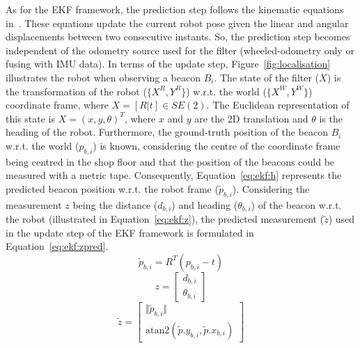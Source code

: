 \documentclass[conference]{IEEEtran}
\begin{document}
As for the EKF framework, the prediction step follows the kinematic equations in~\cite{5dpo:sousa-2022}. These equations update the current robot pose given the linear and angular displacements between two consecutive instants. So, the prediction step becomes independent of the odometry source used for the filter (wheeled-odometry only or fusing with IMU data).
In terms of the update step, Figure~\ref{fig:localisation} illustrates the robot when observing a beacon $B_i$.
The state of the filter ($X$) is the transformation of the robot ($\{X^R,Y^R\}$) w.r.t. the world ($\{X^W,Y^W\}$) coordinate frame, where $X=\left[R|t\right]\in SE(2)$. The Euclidean representation of this state is $X=\left(x,y,\theta\right)^T$, where $x$ and $y$ are the 2D translation and $\theta$ is the heading of the robot.
Furthermore, the ground-truth position of the beacon $B_i$ w.r.t. the world ($p_{b,i}$) is known, considering the centre of the coordinate frame being centred in the shop floor and that the position of the beacons could be measured with a metric tape.
Consequently, Equation~\ref{eq:ekf:h} represents the predicted beacon position w.r.t. the robot frame ($\tilde{p}_{b,i}$).
Considering the measurement $z$ being the distance ($d_{b,i}$) and heading ($\theta_{b,i}$) of the beacon w.r.t. the robot (illustrated in Equation~\ref{eq:ekf:z}), the predicted measurement ($\tilde{z}$) used in the update step of the EKF framework is formulated in Equation~\ref{eq:ekf:zpred}.
\begin{equation}\label{eq:ekf:h}
\tilde{p}_{b,i} = R^T \left( p_{b,i} - t \right)
\end{equation}
\begin{equation}\label{eq:ekf:z}
z=\begin{bmatrix}
d_{b,i}\\
\theta_{b,i}
\end{bmatrix}
\end{equation}
\begin{equation}\label{eq:ekf:zpred}
\tilde{z} = \begin{bmatrix}
\Vert \tilde{p}_{b,i} \Vert \\
\text{atan2}\left(\tilde{p}.y_{b,i},\tilde{p}.x_{b,i}\right)
\end{bmatrix}
\end{equation}
\end{document}
